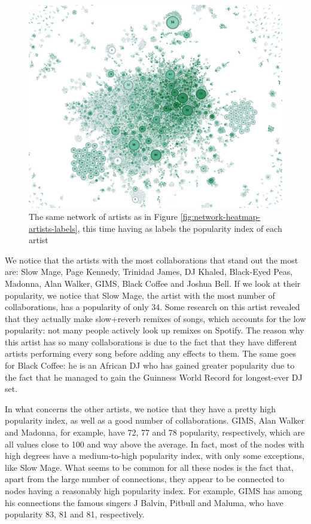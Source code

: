 \documentclass[sigchi]{acmart}
\begin{document}
\begin{figure}[h!]
    \centering
    \includegraphics[width=1\linewidth]{img/Network_Heatmap_for_Popularity_WIth_Labels(popularity).png}
    \caption{The same network of artists as in Figure \ref{fig:network-heatmap-artists-labels}, this time having as labels the popularity index of each artist}
    \label{fig:network-heatmap-popularity-labels}
   
\end{figure}

We notice that the artists with the most collaborations that stand out the most are: Slow Mage, Page Kennedy, Trinidad James, DJ Khaled, Black-Eyed Peas, Madonna, Alan Walker, GIMS, Black Coffee and Joshua Bell. If we look at their popularity, we notice that Slow Mage, the artist with the most number of collaborations, has a popularity of only 34. Some research on this artist revealed that they actually make slow+reverb remixes of songs, which accounts for the low popularity: not many people actively look up remixes on Spotify. The reason why this artist has so many collaborations is due to the fact that they have different artists performing every song before adding any effects to them. The same goes for Black Coffee: he is an African DJ who has gained greater popularity due to the fact that he managed to gain the Guinness World Record for longest-ever DJ set.

In what concerns the other artists, we notice that they have a pretty high popularity index, as well as a good number of collaborations. GIMS, Alan Walker and Madonna, for example, have 72, 77 and 78 popularity, respectively, which are all values close to 100 and way above the average. In fact, most of the nodes with high degrees have a medium-to-high popularity index, with only some exceptions, like Slow Mage. What seems to be common for all these nodes is the fact that, apart from the large number of connections, they appear to be connected to nodes having a reasonably high popularity index. For example, GIMS has among his connections the famous singers J Balvin, Pitbull and Maluma, who have popularity 83, 81 and 81, respectively.
\end{document}
